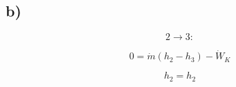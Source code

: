 

\subsection*{b)}

\[
2 \rightarrow 3:
\]

\[
0 = \dot{m} (h_2 - h_3) - \dot{W}_K
\]

\[
h_2 = h_2
\]